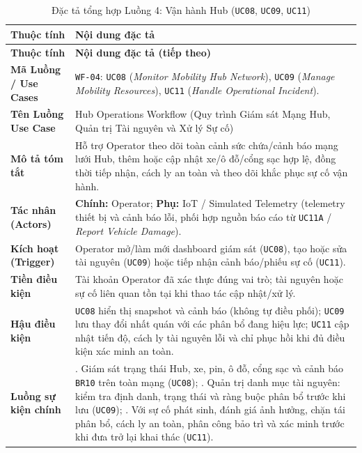 {\small
\begin{longtable}{>{\raggedright\arraybackslash\bfseries}p{3.5cm} >{\raggedright\arraybackslash}p{\dimexpr\textwidth-3.5cm-4\tabcolsep\relax}}
\caption{Đặc tả tổng hợp Luồng 4: Vận hành Hub (\texttt{UC08}, \texttt{UC09}, \texttt{UC11})} \label{tab:wf-ops} \\
\toprule
Thuộc tính & \textbf{Nội dung đặc tả} \\
\midrule
\endfirsthead
\toprule
Thuộc tính & \textbf{Nội dung đặc tả (tiếp theo)} \\
\midrule
\endhead
\bottomrule
\endfoot
Mã Luồng / Use Cases & \texttt{WF-04}: \texttt{UC08} (\textit{Monitor Mobility Hub Network}), \texttt{UC09} (\textit{Manage Mobility Resources}), \texttt{UC11} (\textit{Handle Operational Incident}). \\
Tên Luồng Use Case & Hub Operations Workflow (Quy trình Giám sát Mạng Hub, Quản trị Tài nguyên và Xử lý Sự cố) \\
Mô tả tóm tắt & Hỗ trợ Operator theo dõi toàn cảnh sức chứa/cảnh báo mạng lưới Hub, thêm hoặc cập nhật xe/ô đỗ/cổng sạc hợp lệ, đồng thời tiếp nhận, cách ly an toàn và theo dõi khắc phục sự cố vận hành. \\
Tác nhân (Actors) & \textbf{Chính:} Operator; \textbf{Phụ:} IoT / Simulated Telemetry (telemetry thiết bị và cảnh báo lỗi, phối hợp nguồn báo cáo từ \texttt{UC11A} / \textit{Report Vehicle Damage}). \\
Kích hoạt (Trigger) & Operator mở/làm mới dashboard giám sát (\texttt{UC08}), tạo hoặc sửa tài nguyên (\texttt{UC09}) hoặc tiếp nhận cảnh báo/phiếu sự cố (\texttt{UC11}). \\
Tiền điều kiện & Tài khoản Operator đã xác thực đúng vai trò; tài nguyên hoặc sự cố liên quan tồn tại khi thao tác cập nhật/xử lý. \\
Hậu điều kiện & \texttt{UC08} hiển thị snapshot và cảnh báo (không tự điều phối); \texttt{UC09} lưu thay đổi nhất quán với các phân bổ đang hiệu lực; \texttt{UC11} cập nhật tiến độ, cách ly tài nguyên lỗi và chỉ phục hồi khi đủ điều kiện xác minh an toàn. \\
Luồng sự kiện chính & 1. Giám sát trạng thái Hub, xe, pin, ô đỗ, cổng sạc và cảnh báo \texttt{BR10} trên toàn mạng (\texttt{UC08}); \newline 2. Quản trị danh mục tài nguyên: kiểm tra định danh, trạng thái và ràng buộc phân bổ trước khi lưu (\texttt{UC09}); \newline 3. Với sự cố phát sinh, đánh giá ảnh hưởng, chặn tái phân bổ, cách ly an toàn, phân công bảo trì và xác minh trước khi đưa trở lại khai thác (\texttt{UC11}). \\

\end{longtable}}
